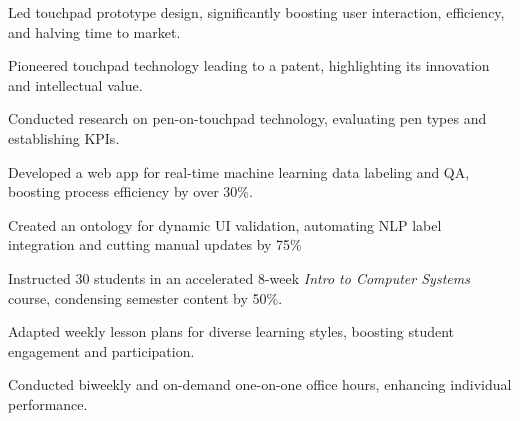 \documentclass[]{resume-openfont}
\begin{document}
\begin{minipage}[t]{1\textwidth}
\begin{tightemize}
    \item Led touchpad prototype design, significantly boosting user interaction, efficiency, and halving time to market.
    \item Pioneered touchpad technology leading to a patent, highlighting its innovation and intellectual value.
    \item Conducted research on pen-on-touchpad technology, evaluating pen types and establishing KPIs.
\end{tightemize}
\sectionsep

\begin{tightemize}
    \item Developed a web app for real-time machine learning data labeling and QA, boosting process efficiency by over 30\%.
    \item Created an ontology for dynamic UI validation, automating NLP label integration and cutting manual updates by 75\%
\end{tightemize}
\sectionsep

\begin{tightemize}
    \item Instructed 30 students in an accelerated 8-week {\it Intro to Computer Systems} course, condensing semester content by 50\%.
    \item Adapted weekly lesson plans for diverse learning styles, boosting student engagement and participation.
    \item Conducted biweekly and on-demand one-on-one office hours, enhancing individual performance.
\end{tightemize}
\sectionsep

\end{minipage}
\end{document}
